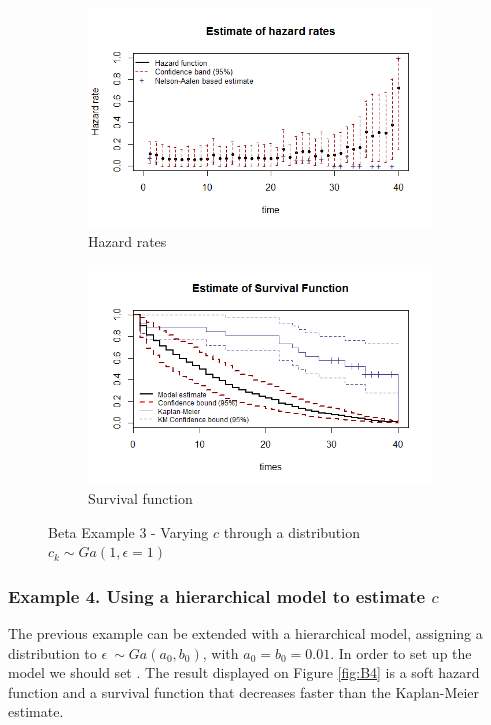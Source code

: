 \documentclass[letterpaper]{article}\usepackage[]{graphicx}\usepackage[]{color}
\begin{document}
\begin{figure}
  \centering
  \begin{subfigure}[a]{\textwidth}\centering
    \includegraphics[width=\textwidth]{B31.png}
    \caption{Hazard rates}
  \end{subfigure}
  \begin{subfigure}[b]{\textwidth}\centering
    \includegraphics[width=\textwidth]{B32.png}
    \caption{Survival function}
  \end{subfigure}
  \caption{Beta Example 3 - Varying $c$ through a distribution $c_k\sim Ga(1,\epsilon = 1)$}
  \label{fig:B3}
\end{figure}

\subsubsection{Example 4. Using a hierarchical model to estimate $c$}

The previous example can be extended with a hierarchical model, assigning a distribution to $\epsilon ~ \sim Ga(a_0,b_0)$, with $a_0=b_0=0.01$. In order to set up the model we should set . The result displayed on Figure \ref{fig:B4} is a soft hazard function and a survival function that decreases faster than the Kaplan-Meier estimate.
\end{document}

